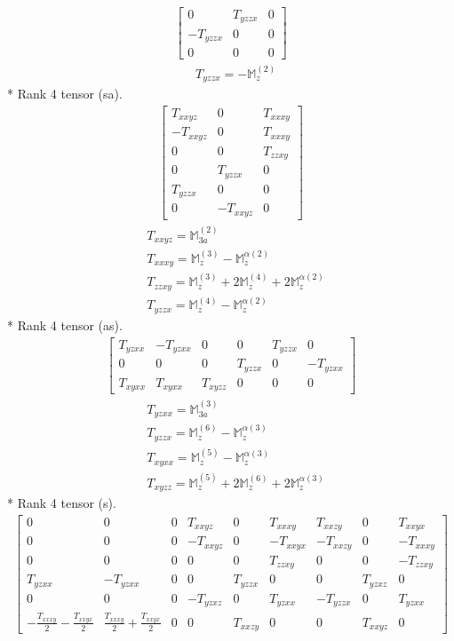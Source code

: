 \documentclass[fleqn,8pt,landscape]{jsarticle}
\begin{document}
\begin{align*}
\begin{bmatrix} 0 & T_{yzzx} & 0 \\ - T_{yzzx} & 0 & 0 \\ 0 & 0 & 0 \end{bmatrix}
\end{align*}
\begin{align*}
& T_{yzzx} = - \mathbb{M}_{z}^{(2)}
\end{align*}
* Rank 4 tensor (sa).
\begin{align*}
\begin{bmatrix} T_{xxyz} & 0 & T_{xxxy} \\ - T_{xxyz} & 0 & T_{xxxy} \\ 0 & 0 & T_{zzxy} \\ 0 & T_{yzzx} & 0 \\ T_{yzzx} & 0 & 0 \\ 0 & - T_{xxyz} & 0 \end{bmatrix}
\end{align*}
\begin{align*}
& T_{xxyz} = \mathbb{M}_{3a}^{(2)} \\
& T_{xxxy} = \mathbb{M}_{z}^{(3)} - \mathbb{M}_{z}^{\alpha(2)} \\
& T_{zzxy} = \mathbb{M}_{z}^{(3)} + 2 \mathbb{M}_{z}^{(4)} + 2 \mathbb{M}_{z}^{\alpha(2)} \\
& T_{yzzx} = \mathbb{M}_{z}^{(4)} - \mathbb{M}_{z}^{\alpha(2)}
\end{align*}
* Rank 4 tensor (as).
\begin{align*}
\begin{bmatrix} T_{yzxx} & - T_{yzxx} & 0 & 0 & T_{yzzx} & 0 \\ 0 & 0 & 0 & T_{yzzx} & 0 & - T_{yzxx} \\ T_{xyxx} & T_{xyxx} & T_{xyzz} & 0 & 0 & 0 \end{bmatrix}
\end{align*}
\begin{align*}
& T_{yzxx} = \mathbb{M}_{3a}^{(3)} \\
& T_{yzzx} = \mathbb{M}_{z}^{(6)} - \mathbb{M}_{z}^{\alpha(3)} \\
& T_{xyxx} = \mathbb{M}_{z}^{(5)} - \mathbb{M}_{z}^{\alpha(3)} \\
& T_{xyzz} = \mathbb{M}_{z}^{(5)} + 2 \mathbb{M}_{z}^{(6)} + 2 \mathbb{M}_{z}^{\alpha(3)}
\end{align*}
* Rank 4 tensor (s).
\begin{align*}
\begin{bmatrix} 0 & 0 & 0 & T_{xxyz} & 0 & T_{xxxy} & T_{xxzy} & 0 & T_{xxyx} \\ 0 & 0 & 0 & - T_{xxyz} & 0 & - T_{xxyx} & - T_{xxzy} & 0 & - T_{xxxy} \\ 0 & 0 & 0 & 0 & 0 & T_{zzxy} & 0 & 0 & - T_{zzxy} \\ T_{yzxx} & - T_{yzxx} & 0 & 0 & T_{yzzx} & 0 & 0 & T_{yzxz} & 0 \\ 0 & 0 & 0 & - T_{yzxz} & 0 & T_{yzxx} & - T_{yzzx} & 0 & T_{yzxx} \\ - \frac{T_{xxxy}}{2} - \frac{T_{xxyx}}{2} & \frac{T_{xxxy}}{2} + \frac{T_{xxyx}}{2} & 0 & 0 & T_{xxzy} & 0 & 0 & T_{xxyz} & 0 \end{bmatrix}
\end{align*}
\end{document}
